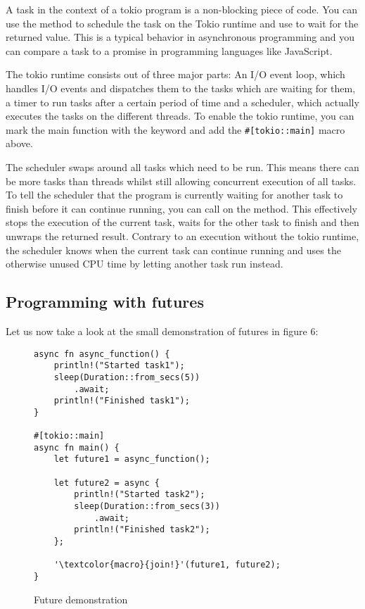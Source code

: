 A task in the context of a tokio program is a non-blocking piece of code. You can use the 
method to schedule the task on the Tokio runtime and use  to wait for the returned value. This is a typical
behavior in asynchronous programming and you can compare a task to a promise in programming languages like JavaScript.

The tokio runtime consists out of three major parts: An I/O event loop, which handles I/O events and dispatches them to
the tasks which are waiting for them, a timer to run tasks after a certain period of time and  a scheduler, which
actually executes the tasks on the different threads. To enable the tokio runtime, you can mark the main function with
the  keyword and add the \texttt{#[tokio::main]} macro above.

The scheduler swaps around all tasks which need to be run. This means there can be more tasks than threads whilst still
allowing concurrent execution of all tasks. To tell the scheduler that the program is currently waiting for another
task to finish before it can continue running, you can call  on the method. This effectively stops the
execution of the current task, waits for the other task to finish and then unwraps the returned result. Contrary to an
execution without the tokio runtime, the scheduler knows when the current task can continue running and uses the
otherwise unused CPU time by letting another task run instead.

\subsection{Programming with futures}
Let us now take a look at the small demonstration of futures in figure 6:

\begin{figure}[h]
    \begin{verbatim}
async fn async_function() {
    println!("Started task1");
    sleep(Duration::from_secs(5))
        .await;
    println!("Finished task1");
}

#[tokio::main]
async fn main() {
    let future1 = async_function();

    let future2 = async {
        println!("Started task2");
        sleep(Duration::from_secs(3))
            .await;
        println!("Finished task2");
    };

    '\textcolor{macro}{join!}'(future1, future2);
}
    \end{verbatim}
    \caption{Future demonstration}
\end{figure}


